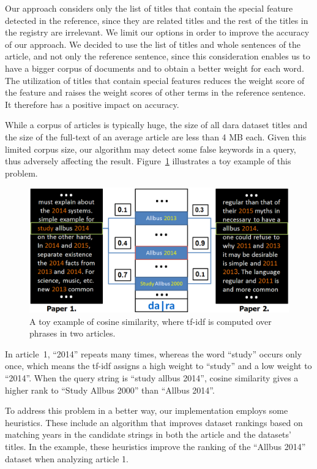 \documentclass{IOS-Book-Article}
\newcommand{\dara}{\textsf{da\textbar ra}}
\begin{document}
Our approach considers only the list of titles that contain the special feature detected in the reference, since they are related titles and the rest of the titles in the registry are irrelevant.
We limit our options in order to improve the accuracy of our approach.
We decided to use the list of titles and whole sentences of the article, and not only the reference sentence, since this consideration enables us to have a bigger corpus of documents and to obtain a better weight for each word.
The utilization of titles that contain special features reduces the weight score of the feature and raises the weight scores of other terms in the reference sentence.
It therefore has a positive impact on accuracy.

While a corpus of articles is typically huge, the size of all {\dara} dataset titles and the size of the full-text of an average article are less than 4 MB each.
Given this limited corpus size, our algorithm may detect some false keywords in a query, thus adversely affecting the result.
Figure~\ref{fig:similarity-example} illustrates a toy example of this problem.

\begin{figure}[h]
	\centering
	\includegraphics[width=4.5 in]{ToyExamplE.PNG} 
	\caption{A toy example of cosine similarity, where tf-idf is computed over phrases in two articles.}
	\label{fig:similarity-example}
\end{figure}

In article~1, \enquote{2014} repeats many times, whereas the word \enquote{study} occurs only once, which means the tf-idf assigns a high weight to \enquote{study} and a low weight to \enquote{2014}. When the query string is \enquote{study allbus 2014}, cosine similarity gives a higher rank to \enquote{Study Allbus 2000} than \enquote{Allbus 2014}.

To address this problem in a better way, our implementation employs some heuristics.
These include an algorithm that improves dataset rankings based on matching years in the candidate strings in both the article and the datasets' titles.
In the example, these heuristics improve the ranking of the \enquote{Allbus 2014} dataset when analyzing article 1. 
\end{document}
